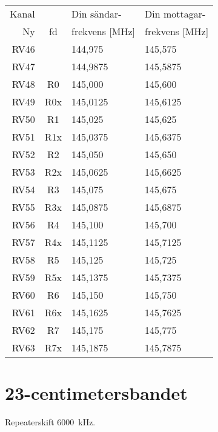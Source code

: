 \begin{tabular}{ r | c | l | l }
	Kanal & & Din sändar- & Din mottagar- \\
	Ny    & fd & frekvens [MHz] & frekvens [MHz] \\
	\hline
	RV46 & & 144,975 & 145,575\\
	RV47 & & 144,9875 & 145,5875\\
	RV48 & R0 & 145,000 & 145,600 \\
	RV49 & R0x & 145,0125 & 145,6125 \\
	RV50 & R1 & 145,025 & 145,625 \\
	RV51 & R1x & 145,0375 & 145,6375 \\
	RV52 & R2 & 145,050 & 145,650 \\
	RV53 & R2x & 145,0625 & 145,6625 \\
	RV54 & R3 & 145,075 & 145,675 \\
	RV55 & R3x & 145,0875 & 145,6875 \\
	RV56 & R4 & 145,100 & 145,700 \\
	RV57 & R4x & 145,1125 & 145,7125 \\
	RV58 & R5 & 145,125 & 145,725 \\
	RV59 & R5x & 145,1375 & 145,7375 \\
	RV60 & R6 & 145,150 & 145,750 \\
	RV61 & R6x & 145,1625 & 145,7625 \\
	RV62 & R7 & 145,175 & 145,775 \\
	RV63 & R7x & 145,1875 & 145,7875 \\
\end{tabular}

\section{23-centimetersbandet}
Repeaterskift \SI{6000}{\kilo\hertz}.

